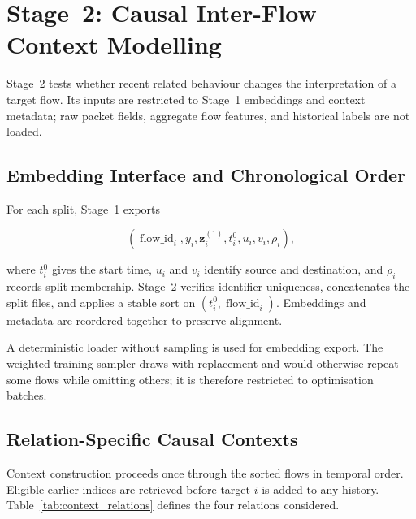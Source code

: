 \documentclass[11pt,fleqn]{report}
\begin{document}
\section{Stage~2: Causal Inter-Flow Context Modelling}
\label{subsec:method_stage2}

Stage~2 tests whether recent related behaviour changes the interpretation of a target flow. Its inputs are restricted to Stage~1 embeddings and context metadata; raw packet fields, aggregate flow features, and historical labels are not loaded.

\subsection{Embedding Interface and Chronological Order}
\label{subsubsec:embedding_interface}

For each split, Stage~1 exports

\begin{equation}
    \left(
      \operatorname{flow\_id}_i,
      y_i,
      \mathbf{z}^{(1)}_i,
      t_i^{0},u_i,v_i,\rho_i
    \right),
    \label{eq:stage1_export_tuple}
\end{equation}

where $t_i^{0}$ gives the start time, $u_i$ and $v_i$ identify source and destination, and $\rho_i$ records split membership. Stage~2 verifies identifier uniqueness, concatenates the split files, and applies a stable sort on $(t_i^{0},\operatorname{flow\_id}_i)$. Embeddings and metadata are reordered together to preserve alignment.

A deterministic loader without sampling is used for embedding export. The weighted training sampler draws with replacement and would otherwise repeat some flows while omitting others; it is therefore restricted to optimisation batches.

\subsection{Relation-Specific Causal Contexts}
\label{subsubsec:context_relations}

Context construction proceeds once through the sorted flows in temporal order. Eligible earlier indices are retrieved before target $i$ is added to any history. Table~\ref{tab:context_relations} defines the four relations considered.
\end{document}
